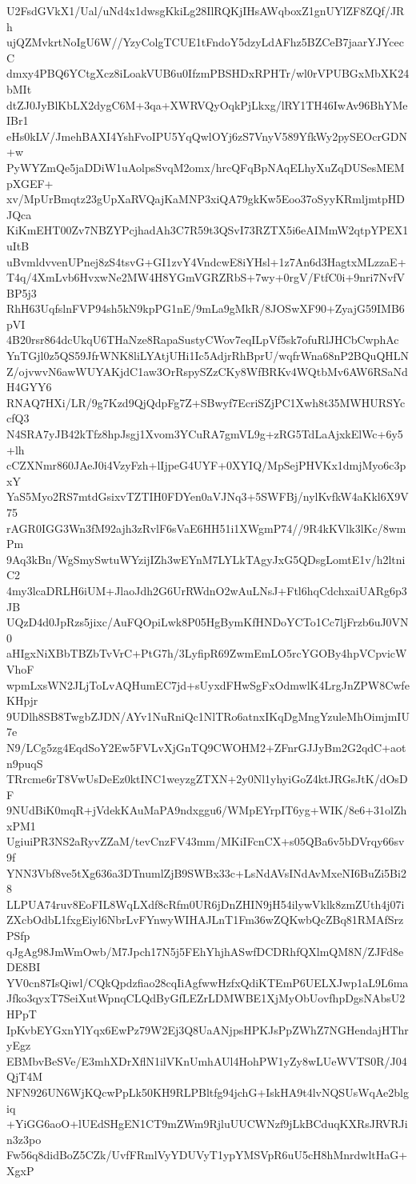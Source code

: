 U2FsdGVkX1/Ual/uNd4x1dwsgKkiLg28IlRQKjIHsAWqboxZ1gnUYlZF8ZQf/JRh
ujQZMvkrtNoIgU6W//YzyColgTCUE1tFndoY5dzyLdAFhz5BZCeB7jaarYJYcecC
dmxy4PBQ6YCtgXcz8iLoakVUB6u0IfzmPBSHDxRPHTr/wl0rVPUBGxMbXK24bMIt
dtZJ0JyBlKbLX2dygC6M+3qa+XWRVQyOqkPjLkxg/lRY1TH46IwAv96BhYMeIBr1
eHs0kLV/JmehBAXI4YshFvoIPU5YqQwlOYj6zS7VnyV589YfkWy2pySEOcrGDN+w
PyWYZmQe5jaDDiW1uAolpsSvqM2omx/hrcQFqBpNAqELhyXuZqDUSesMEMpXGEF+
xv/MpUrBmqtz23gUpXaRVQajKaMNP3xiQA79gkKw5Eoo37oSyyKRmljmtpHDJQca
KiKmEHT00Zv7NBZYPcjhadAh3C7R59t3QSvI73RZTX5i6eAIMmW2qtpYPEX1uItB
uBvmldvvenUPnej8zS4tsvG+GI1zvY4VndcwE8iYHsl+1z7An6d3HagtxMLzzaE+
T4q/4XmLvb6HvxwNe2MW4H8YGmVGRZRbS+7wy+0rgV/FtfC0i+9nri7NvfVBP5j3
RhH63UqfslnFVP94sh5kN9kpPG1nE/9mLa9gMkR/8JOSwXF90+ZyajG59IMB6pVI
4B20rsr864dcUkqU6THaNze8RapaSustyCWov7eqILpVf5sk7ofuRlJHCbCwphAc
YnTGjl0z5QS59JfrWNK8liLYAtjUHi1Ic5AdjrRhBprU/wqfrWna68nP2BQuQHLN
Z/ojvwvN6awWUYAKjdC1aw3OrRspySZzCKy8WfBRKv4WQtbMv6AW6RSaNdH4GYY6
RNAQ7HXi/LR/9g7Kzd9QjQdpFg7Z+SBwyf7EcriSZjPC1Xwh8t35MWHURSYccfQ3
N4SRA7yJB42kTfz8hpJsgj1Xvom3YCuRA7gmVL9g+zRG5TdLaAjxkElWc+6y5+lh
cCZXNmr860JAeJ0i4VzyFzh+lIjpeG4UYF+0XYIQ/MpSejPHVKx1dmjMyo6c3pxY
YaS5Myo2RS7mtdGsixvTZTIH0FDYen0aVJNq3+5SWFBj/nylKvfkW4aKkl6X9V75
rAGR0IGG3Wn3fM92ajh3zRvlF6sVaE6HH51i1XWgmP74//9R4kKVlk3lKc/8wmPm
9Aq3kBn/WgSmySwtuWYzijIZh3wEYnM7LYLkTAgyJxG5QDsgLomtE1v/h2ltniC2
4my3lcaDRLH6iUM+JlaoJdh2G6UrRWdnO2wAuLNsJ+Ftl6hqCdchxaiUARg6p3JB
UQzD4d0JpRzs5jixc/AuFQOpiLwk8P05HgBymKfHNDoYCTo1Cc7ljFrzb6uJ0VN0
aHIgxNiXBbTBZbTvVrC+PtG7h/3LyfipR69ZwmEmLO5rcYGOBy4hpVCpvicWVhoF
wpmLxsWN2JLjToLvAQHumEC7jd+sUyxdFHwSgFxOdmwlK4LrgJnZPW8CwfeKHpjr
9UDlh8SB8TwgbZJDN/AYv1NuRniQc1NlTRo6atnxIKqDgMngYzuleMhOimjmIU7e
N9/LCg5zg4EqdSoY2Ew5FVLvXjGnTQ9CWOHM2+ZFnrGJJyBm2G2qdC+aotn9puqS
TRrcme6rT8VwUsDeEz0ktINC1weyzgZTXN+2y0Nl1yhyiGoZ4ktJRGsJtK/dOsDF
9NUdBiK0mqR+jVdekKAuMaPA9ndxggu6/WMpEYrpIT6yg+WIK/8e6+31olZhxPM1
UgiuiPR3NS2aRyvZZaM/tevCnzFV43mm/MKiIFcnCX+s05QBa6v5bDVrqy66sv9f
YNN3Vbf8ve5tXg636a3DTnumlZjB9SWBx33c+LsNdAVsINdAvMxeNI6BuZi5Bi28
LLPUA74ruv8EoFIL8WqLXdf8cRfm0UR6jDnZHIN9jH54ilywVklk8zmZUth4j07i
ZXcbOdbL1fxgEiyl6NbrLvFYnwyWIHAJLnT1Fm36wZQKwbQcZBq81RMAfSrzPSfp
qJgAg98JmWmOwb/M7Jpch17N5j5FEhYhjhASwfDCDRhfQXlmQM8N/ZJFd8eDE8BI
YV0cn87IsQiwl/CQkQpdzfiao28cqIiAgfwwHzfxQdiKTEmP6UELXJwp1aL9L6ma
Jfko3qyxT7SeiXutWpnqCLQdByGfLEZrLDMWBE1XjMyObUovfhpDgsNAbsU2HPpT
IpKvbEYGxnYlYqx6EwPz79W2Ej3Q8UaANjpsHPKJsPpZWhZ7NGHendajHThryEgz
EBMbvBeSVe/E3mhXDrXflN1ilVKnUmhAUl4HohPW1yZy8wLUeWVTS0R/J04QjT4M
NFN926UN6WjKQcwPpLk50KH9RLPBltfg94jchG+IskHA9t4lvNQSUsWqAe2blgiq
+YiGG6aoO+lUEdSHgEN1CT9mZWm9RjluUUCWNzf9jLkBCduqKXRsJRVRJin3z3po
Fw56q8didBoZ5CZk/UvfFRmlVyYDUVyT1ypYMSVpR6uU5cH8hMnrdwltHaG+XgxP
